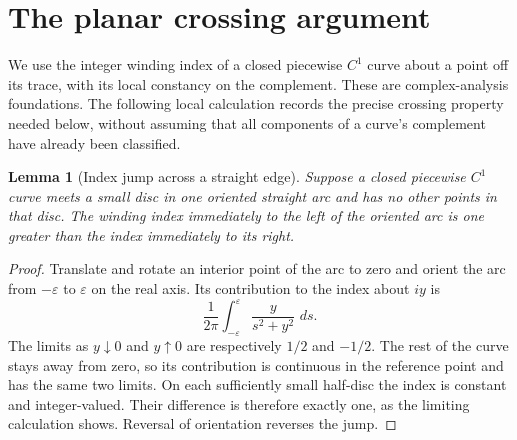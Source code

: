 \documentclass[11pt,oneside]{book}
\newtheorem{lemma}[theorem]{Lemma}
\theoremstyle{definition}
\theoremstyle{remark}\newtheorem{remark}[theorem]{Remark}
\newcommand{\dd}{\,d}\newcommand{\id}{\operatorname{id}}
\begin{document}
\section{The planar crossing argument}

We use the integer winding index of a closed piecewise \(C^1\) curve
about a point off its trace, with its local constancy on the complement.
These are complex-analysis foundations. The following local calculation
records the precise crossing property needed below, without assuming
that all components of a curve's complement have already been classified.

\begin{lemma}[Index jump across a straight edge]\label{d13:13:index-jump}
Suppose a closed piecewise \(C^1\) curve meets a small disc in one
oriented straight arc and has no other points in that disc. The winding
index immediately to the left of the oriented arc is one greater than
the index immediately to its right.
\end{lemma}
\begin{proof}
Translate and rotate an interior point of the arc to zero and orient
the arc from \(-\varepsilon\) to \(\varepsilon\) on the real axis.
Its contribution to the index about \(iy\) is
\[
 \frac1{2\pi}\int_{-\varepsilon}^{\varepsilon}
             \frac{y}{s^2+y^2}\,\dd s .
\]
The limits as \(y\downarrow0\) and \(y\uparrow0\) are respectively
\(1/2\) and \(-1/2\). The rest of the curve stays away from zero, so its
contribution is continuous in the reference point and has the same
two limits. On each sufficiently small half-disc the index is constant
and integer-valued. Their difference is therefore exactly one, as the
limiting calculation shows. Reversal of orientation reverses the jump.
\end{proof}
\end{document}
